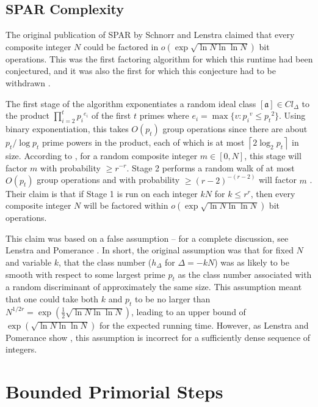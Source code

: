 \documentclass{ucalgthes1}
\theoremstyle{definition}
\newcommand{\ceil}[1]{\left\lceil #1 \right\rceil}
\newcommand{\aclass}{[\mathfrak a]}
\begin{document}
\subsection{SPAR Complexity}


The original publication of SPAR by Schnorr and Lenstra \cite{Schnorr1984} claimed that every composite integer $N$ could be factored in $o\left(\exp\sqrt{\ln N \ln\ln N}\right)$ bit operations.  This was the first factoring algorithm for which this runtime had been conjectured, and it was also the first for which this conjecture had to be withdrawn \cite{Lenstra1992}.

The first stage of the algorithm exponentiates a random ideal class $\aclass \in Cl_\Delta$ to the product $\prod_{i=2}^t {p_i}^{e_i}$ of the first $t$ primes where $e_i = \max \{ v : {p_i}^v \le {p_t}^2 \}$.  Using binary exponentiation, this takes $O(p_t)$ group operations since there are about $p_t / \log p_t$ prime powers in the product, each of which is at most $\ceil{2 \log_2 p_t}$ in size. According to \cite[p.290]{Schnorr1984}, for a random composite integer $m \in [0, N]$, this stage will factor $m$ with probability $\ge r^{-r}$. Stage 2 performs a random walk of at most $O(p_t)$ group operations and with probability $\ge (r-2)^{-(r-2)}$ will factor $m$ \cite[p.290]{Schnorr1984}.  Their claim is that if Stage 1 is run on each integer $kN$ for $k \le r^r$, then every composite integer $N$ will be factored within $o\left(\exp \sqrt{ \ln N \ln\ln N } \right)$ bit operations.

This claim was based on a false assumption -- for a complete discussion, see Lenstra and Pomerance \cite[\S 11]{Lenstra1992}.  In short, the original assumption was that for fixed $N$ and variable $k$, that the class number ($h_\Delta$ for $\Delta = -kN$) was as likely to be smooth with respect to some largest prime $p_t$ as the class number associated with a random discriminant of approximately the same size.  This assumption meant that one could take both $k$ and $p_t$ to be no larger than $N^{1/2r} = \exp\left(\frac{1}{2}\sqrt{\ln N \ln \ln N}\right)$, leading to an upper bound of $\exp\left(\sqrt{\ln N \ln \ln N}\right)$ for the expected running time.  However, as Lenstra and Pomerance show \cite[\S 11]{Lenstra1992}, this assumption is incorrect for a sufficiently dense sequence of integers.


\bigbreak
\section{Bounded Primorial Steps}
\label{sec:primorial}
\end{document}
